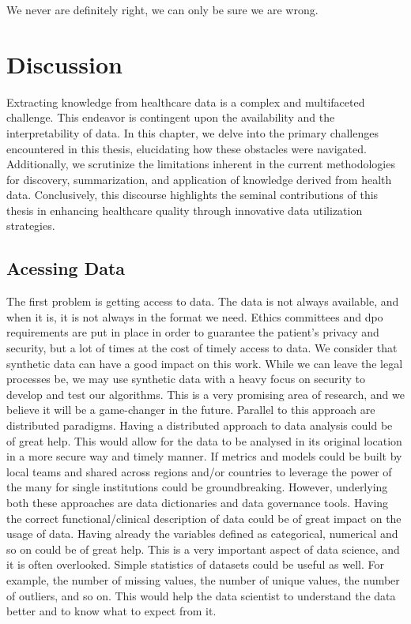 \begin{savequote}[75mm]
We never are definitely right, we can only be sure we are wrong.
\end{savequote}
\chapter{Discussion} \label{chap:disc}


Extracting knowledge from healthcare data is a complex and multifaceted challenge. This endeavor is contingent upon the availability and the interpretability of data. In this chapter, we delve into the primary challenges encountered in this thesis, elucidating how these obstacles were navigated. Additionally, we scrutinize the limitations inherent in the current methodologies for discovery, summarization, and application of knowledge derived from health data. Conclusively, this discourse highlights the seminal contributions of this thesis in enhancing healthcare quality through innovative data utilization strategies.

\section{Acessing Data}
The first problem is getting access to data. The data is not always available, and when it is, it is not always in the format we need. Ethics committees and \ac{dpo} requirements are put in place in order to guarantee the patient's privacy and security, but a lot of times at the cost of timely access to data. We consider that synthetic data can have a good impact on this work. While we can leave the legal processes be, we may use synthetic data with a heavy focus on security to develop and test our algorithms. This is a very promising area of research, and we believe it will be a game-changer in the future.
Parallel to this approach are distributed paradigms. Having a distributed approach to data analysis could be of great help. This would allow for the data to be analysed in its original location in a more secure way and timely manner. If metrics and models could be built by local teams and shared across regions and/or countries to leverage the power of the many for single institutions could be groundbreaking. However, underlying both these approaches are data dictionaries and data governance tools. Having the correct functional/clinical description of data could be of great impact on the usage of data. Having already the variables defined as categorical, numerical and so on could be of great help. This is a very important aspect of data science, and it is often overlooked. Simple statistics of datasets could be useful as well. For example, the number of missing values, the number of unique values, the number of outliers, and so on. This would help the data scientist to understand the data better and to know what to expect from it. 

